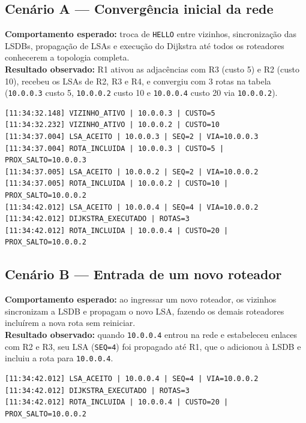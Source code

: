 ﻿\documentclass[11pt,a4paper]{article}
\begin{document}
\subsection{Cenário A --- Convergência inicial da rede}
\textbf{Comportamento esperado:} troca de \texttt{HELLO} entre vizinhos, sincronização das LSDBs, propagação de LSAs e execução do Dijkstra até todos os roteadores conhecerem a topologia completa.\\
\textbf{Resultado observado:} R1 ativou as adjacências com R3 (custo 5) e R2 (custo 10), recebeu os LSAs de R2, R3 e R4, e convergiu com 3 rotas na tabela (\texttt{10.0.0.3} custo 5, \texttt{10.0.0.2} custo 10 e \texttt{10.0.0.4} custo 20 via \texttt{10.0.0.2}).
\begin{lstlisting}
[11:34:32.148] VIZINHO_ATIVO | 10.0.0.3 | CUSTO=5
[11:34:32.232] VIZINHO_ATIVO | 10.0.0.2 | CUSTO=10
[11:34:37.004] LSA_ACEITO | 10.0.0.3 | SEQ=2 | VIA=10.0.0.3
[11:34:37.004] ROTA_INCLUIDA | 10.0.0.3 | CUSTO=5 | PROX_SALTO=10.0.0.3
[11:34:37.005] LSA_ACEITO | 10.0.0.2 | SEQ=2 | VIA=10.0.0.2
[11:34:37.005] ROTA_INCLUIDA | 10.0.0.2 | CUSTO=10 | PROX_SALTO=10.0.0.2
[11:34:42.012] LSA_ACEITO | 10.0.0.4 | SEQ=4 | VIA=10.0.0.2
[11:34:42.012] DIJKSTRA_EXECUTADO | ROTAS=3
[11:34:42.012] ROTA_INCLUIDA | 10.0.0.4 | CUSTO=20 | PROX_SALTO=10.0.0.2
\end{lstlisting}

\subsection{Cenário B --- Entrada de um novo roteador}
\textbf{Comportamento esperado:} ao ingressar um novo roteador, os vizinhos sincronizam a LSDB e propagam o novo LSA, fazendo os demais roteadores incluírem a nova rota sem reiniciar.\\
\textbf{Resultado observado:} quando \texttt{10.0.0.4} entrou na rede e estabeleceu enlaces com R2 e R3, seu LSA (\texttt{SEQ=4}) foi propagado até R1, que o adicionou à LSDB e incluiu a rota para \texttt{10.0.0.4}.
\begin{lstlisting}
[11:34:42.012] LSA_ACEITO | 10.0.0.4 | SEQ=4 | VIA=10.0.0.2
[11:34:42.012] DIJKSTRA_EXECUTADO | ROTAS=3
[11:34:42.012] ROTA_INCLUIDA | 10.0.0.4 | CUSTO=20 | PROX_SALTO=10.0.0.2
\end{lstlisting}
\end{document}
